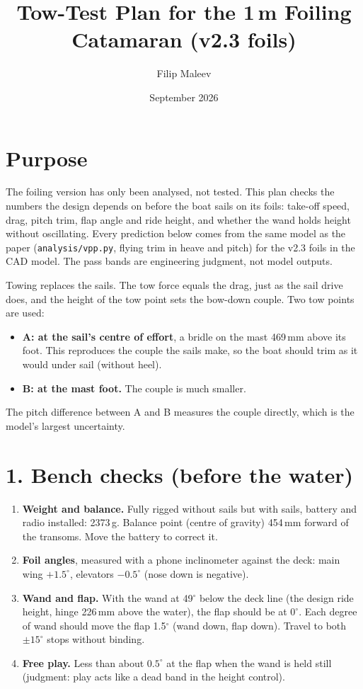 \documentclass[11pt]{article}
\title{\textbf{Tow-Test Plan for the 1\,m Foiling Catamaran (v2.3 foils)}}
\author{Filip Maleev}
\date{September 2026}
\begin{document}
\maketitle

\section*{Purpose}
The foiling version has only been analysed, not tested. This plan checks the numbers the design depends on before the boat sails on its foils: take-off speed, drag, pitch trim, flap angle and ride height, and whether the wand holds height without oscillating. Every prediction below comes from the same model as the paper (\texttt{analysis/vpp.py}, flying trim in heave and pitch) for the v2.3 foils in the CAD model. The pass bands are engineering judgment, not model outputs.

Towing replaces the sails. The tow force equals the drag, just as the sail drive does, and the height of the tow point sets the bow-down couple. Two tow points are used:
\begin{itemize}
\item \textbf{A: at the sail's centre of effort}, a bridle on the mast 469\,mm above its foot. This reproduces the couple the sails make, so the boat should trim as it would under sail (without heel).
\item \textbf{B: at the mast foot.} The couple is much smaller.
\end{itemize}
The pitch difference between A and B measures the couple directly, which is the model's largest uncertainty.

\section*{1. Bench checks (before the water)}
\begin{enumerate}
\item \textbf{Weight and balance.} Fully rigged without sails but with sails, battery and radio installed: 2373\,g. Balance point (centre of gravity) 454\,mm forward of the transoms. Move the battery to correct it.
\item \textbf{Foil angles}, measured with a phone inclinometer against the deck: main wing $+1.5^\circ$, elevators $-0.5^\circ$ (nose down is negative).
\item \textbf{Wand and flap.} With the wand at 49$^\circ$ below the deck line (the design ride height, hinge 226\,mm above the water), the flap should be at $0^\circ$. Each degree of wand should move the flap 1.5$^\circ$ (wand down, flap down). Travel to both $\pm15^\circ$ stops without binding.
\item \textbf{Free play.} Less than about $0.5^\circ$ at the flap when the wand is held still (judgment: play acts like a dead band in the height control).
\end{enumerate}
\end{document}
